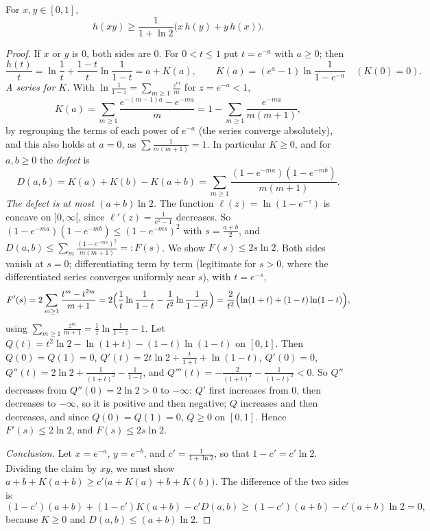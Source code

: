 \begin{lemma}\label{lem:hxy}
For $x,y\in[0,1]$,
\[
h(xy)\ge\frac1{1+\ln2}\bigl(x\,h(y)+y\,h(x)\bigr).
\]
\end{lemma}
\begin{proof}
If $x$ or $y$ is $0$, both sides are $0$. For $0<t\le1$ put $t=e^{-a}$ with $a\ge0$; then
\[
\frac{h(t)}t=\ln\frac1t+\frac{1-t}t\ln\frac1{1-t}=a+K(a),\qquad K(a)=(e^a-1)\ln\frac1{1-e^{-a}}\quad(K(0)=0).
\]
\emph{A series for $K$.} With $\ln\frac1{1-z}=\sum_{m\ge1}\frac{z^m}m$ for $z=e^{-a}<1$,
\[
K(a)=\sum_{m\ge1}\frac{e^{-(m-1)a}-e^{-ma}}m=1-\sum_{m\ge1}\frac{e^{-ma}}{m(m+1)},
\]
by regrouping the terms of each power of $e^{-a}$ (the series converge absolutely), and this also holds at $a=0$, as $\sum\frac1{m(m+1)}=1$. In
particular $K\ge0$, and for $a,b\ge0$ the \emph{defect} is
\[
D(a,b)=K(a)+K(b)-K(a+b)=\sum_{m\ge1}\frac{(1-e^{-ma})(1-e^{-mb})}{m(m+1)}.
\]
\emph{The defect is at most $(a+b)\ln2$.} The function $\ell(z)=\ln(1-e^{-z})$ is concave on $]0,\infty[$, since $\ell'(z)=\frac1{e^z-1}$ decreases. So
$(1-e^{-ma})(1-e^{-mb})\le(1-e^{-ms})^2$ with $s=\frac{a+b}2$, and $D(a,b)\le\sum_m\frac{(1-e^{-ms})^2}{m(m+1)}=:F(s)$. We show $F(s)\le2s\ln2$. Both sides
vanish at $s=0$; differentiating term by term (legitimate for $s>0$, where the differentiated series converges uniformly near $s$), with $t=e^{-s}$,
\[
F'(s)=2\sum_{m\ge1}\frac{t^m-t^{2m}}{m+1}=2\Bigl(\frac1t\ln\frac1{1-t}-\frac1{t^2}\ln\frac1{1-t^2}\Bigr)=\frac2{t^2}\Bigl(\ln(1+t)+(1-t)\ln(1-t)\Bigr),
\]
using $\sum_{m\ge1}\frac{z^m}{m+1}=\frac1z\ln\frac1{1-z}-1$. Let $Q(t)=t^2\ln2-\ln(1+t)-(1-t)\ln(1-t)$ on $[0,1]$. Then $Q(0)=Q(1)=0$,
$Q'(t)=2t\ln2+\frac t{1+t}+\ln(1-t)$, $Q'(0)=0$, $Q''(t)=2\ln2+\frac1{(1+t)^2}-\frac1{1-t}$, and $Q'''(t)=-\frac2{(1+t)^3}-\frac1{(1-t)^2}<0$. So $Q''$
decreases from $Q''(0)=2\ln2>0$ to $-\infty$: $Q'$ first increases from $0$, then decreases to $-\infty$, so it is positive and then negative; $Q$
increases and then decreases, and since $Q(0)=Q(1)=0$, $Q\ge0$ on $[0,1]$. Hence $F'(s)\le2\ln2$, and $F(s)\le2s\ln2$.

\emph{Conclusion.} Let $x=e^{-a}$, $y=e^{-b}$, and $c'=\frac1{1+\ln2}$, so that $1-c'=c'\ln2$. Dividing the claim by $xy$, we must show
$a+b+K(a+b)\ge c'\bigl(a+K(a)+b+K(b)\bigr)$. The difference of the two sides is
\[
(1-c')(a+b)+(1-c')K(a+b)-c'D(a,b)\ge(1-c')(a+b)-c'(a+b)\ln2=0,
\]
because $K\ge0$ and $D(a,b)\le(a+b)\ln2$.
\end{proof}

